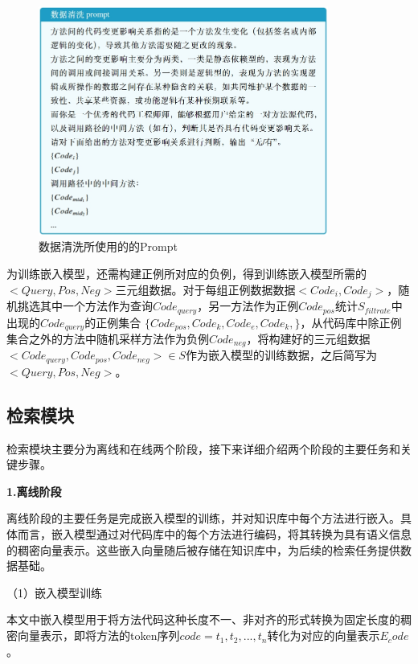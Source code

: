 \begin{figure}[htbp]
\centering
\includegraphics[width = 0.85\textwidth]{figures/2_数据清洗prompt.png}
\caption{数据清洗所使用的的Prompt}
\label{2_数据清洗prompt}
\end{figure}

为训练嵌入模型，还需构建正例所对应的负例，得到训练嵌入模型所需的$<Query,Pos,Neg>$三元组数据。对于每组正例数据数据$<Code_i,Code_j>$，随机挑选其中一个方法作为查询$Code_{query}$，另一方法作为正例$Code_{pos}$统计$S_{filtrate}$中出现的$Code_{query}$的正例集合 $\{Code_{pos},Code_k,Code_e,Code_k,\}$，从代码库中除正例集合之外的方法中随机采样方法作为负例$Code_{neg}$，将构建好的三元组数据$<Code_{query},Code_{pos},Code_{neg}>\in S$作为嵌入模型的训练数据，之后简写为$<Query,Pos,Neg>$。




\subsection{检索模块}

检索模块主要分为离线和在线两个阶段，接下来详细介绍两个阶段的主要任务和关键步骤。

\noindent \textbf{1.离线阶段}

离线阶段的主要任务是完成嵌入模型的训练，并对知识库中每个方法进行嵌入。具体而言，嵌入模型通过对代码库中的每个方法进行编码，将其转换为具有语义信息的稠密向量表示。这些嵌入向量随后被存储在知识库中，为后续的检索任务提供数据基础。

（1）嵌入模型训练

本文中嵌入模型用于将方法代码这种长度不一、非对齐的形式转换为固定长度的稠密向量表示，即将方法的token序列$code={t_1, t_2, ..., t_n}$转化为对应的向量表示$E_code$。

